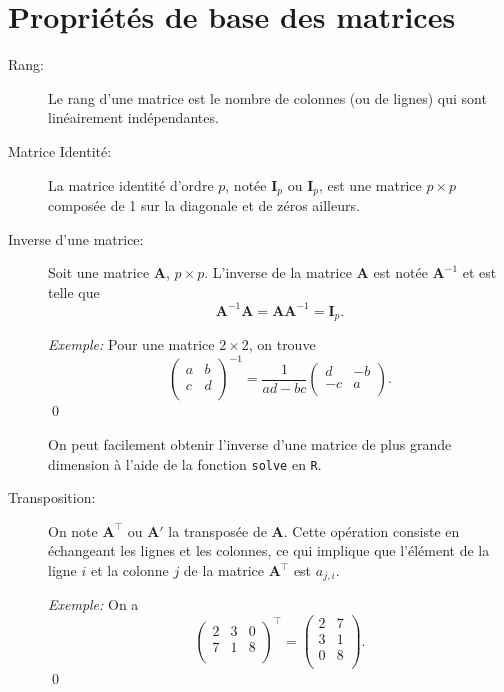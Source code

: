 \section{Propriétés de base des matrices}
\label{sec:elements:proprietes}
\begin{description}
\item[Rang:] Le rang d'une matrice est le nombre de colonnes (ou de lignes) qui sont linéairement indépendantes.
\item[Matrice Identité:] La matrice identité d'ordre $p$, notée $\mathbf{I}_{p}$ ou $\mathbf{I}_{p}$, est une matrice $p\times p$ composée de 1 sur la diagonale et de zéros ailleurs.

\item[Inverse d'une matrice:] Soit une matrice $\mathbf{A}$, $p\times p$. L'inverse de la matrice $\mathbf{A}$ est notée $\mathbf{A}^{-1}$ et est telle que $$\mathbf{A}^{-1}\mathbf{A}=\mathbf{A}\mathbf{A}^{-1}=\mathbf{I}_{p}.$$

\emph{Exemple:}
Pour une matrice $2\times 2$, on trouve $$\begin{pmatrix} a & b \\ c& d\\ \end{pmatrix}^{-1}=\frac{1}{ad-bc}\begin{pmatrix} d & -b \\ -c& a\\ \end{pmatrix}.$$ \qed

On peut facilement obtenir l'inverse d'une matrice de plus grande dimension à l'aide de la fonction \verb'solve' en \verb'R'.

\item[Transposition:] On note $\mathbf{A}^{\top}$ ou $\mathbf{A}'$ la transposée de $\mathbf{A}$. Cette opération consiste en échangeant les lignes et les colonnes, ce qui implique que l'élément de la ligne $i$ et la colonne $j$ de la matrice $\mathbf{A}^{\top}$ est $a_{j,i}$.

\emph{Exemple:}
On a $$\begin{pmatrix} 2 & 3 & 0 \\ 7 & 1 & 8 \\ \end{pmatrix}^{\top}=\begin{pmatrix} 2 & 7 \\3 & 1 \\0 & 8 \\ \end{pmatrix}.$$ \qed


\end{description}
